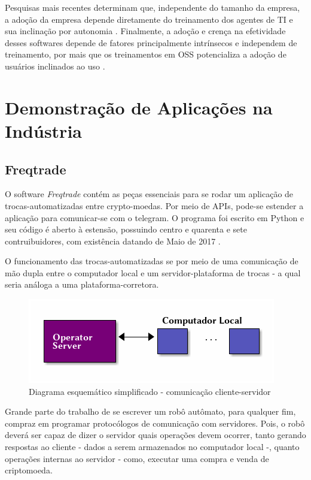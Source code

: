 \documentclass[
12pt,				%
openright,			%
oneside,			%
a4paper,			%
english,			%
french,				%
spanish,			%
brazil,				%
]{abntex2}
\begin{document}
Pesquisas mais recentes determinam que, independente do tamanho da
empresa, a adoção da empresa depende diretamente do treinamento dos
agentes de TI e sua inclinação por autonomia
\cite{racero2020predicting}. Finalmente, a adoção e crença na
efetividade desses softwares depende de fatores principalmente
intrínsecos e independem de treinamento, por mais que os treinamentos
em OSS potencializa a adoção de usuários inclinados ao uso
\cite{racero2021can}.

\section{Demonstração de Aplicações na Indústria}
\subsection{Freqtrade}
O software \emph{Freqtrade} contém as peças essenciais para se rodar
um aplicação de trocas-automatizadas entre crypto-moedas. Por meio de
APIs, pode-se estender a aplicação para comunicar-se com o
telegram. O programa foi escrito em Python e seu código é aberto à
estensão, possuindo centro e quarenta e sete contruibuidores, com existência datando de Maio de 2017 \cite{fang2020cryptocurrency}.

O funcionamento das trocas-automatizadas se por meio de uma
comunicação de mão dupla entre o computador local e um
servidor-plataforma de trocas - a qual seria análoga a uma
plataforma-corretora.

\begin{figure}[ht]
  \centering
  \caption{\label{fig:diagrama-freqtrade} Diagrama esquemático simplificado -
    comunicação cliente-servidor}
  \includegraphics[width=0.6\linewidth]{Imagens/server-client-fq_4.png}
\end{figure}

Grande parte do trabalho de se escrever um robô autômato, para
qualquer fim, compraz em programar protocólogos de comunicação com
servidores. Pois, o robô deverá ser capaz de dizer o servidor quais
operações devem ocorrer, tanto gerando respostas ao cliente - dados a
serem armazenados no computador local -, quanto operações internas ao
servidor - como, executar uma compra e venda de criptomoeda.
\end{document}
